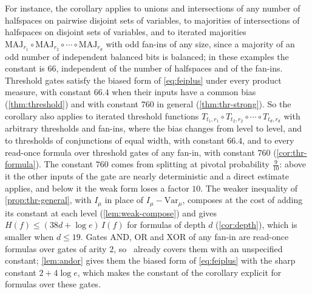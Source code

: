 \documentclass[11pt]{amsart}
\theoremstyle{definition}
\theoremstyle{remark}
\newcommand{\Var}{\mathrm{Var}}
\begin{document}
For instance, the corollary applies to unions and intersections of any number of halfspaces on pairwise disjoint
sets of variables, to majorities of intersections of halfspaces on disjoint sets of variables, and to iterated
majorities $\mathrm{MAJ}_{r_1}\circ\mathrm{MAJ}_{r_2}\circ\cdots\circ\mathrm{MAJ}_{r_d}$ with odd fan-ins of any
size, since a majority of an odd number of independent balanced bits is balanced; in these examples the constant is
$66$, independent of the number of halfspaces and of the fan-ins. Threshold gates satisfy the biased form of
\eqref{eq:feiplus} under every product measure, with constant $66.4$ when their inputs have a common bias
(\cref{thm:threshold}) and with constant $760$ in general (\cref{thm:thr-strong}). So the corollary also applies to
iterated threshold functions $T_{t_1,r_1}\circ T_{t_2,r_2}\circ\cdots\circ T_{t_d,r_d}$ with arbitrary thresholds and
fan-ins, where the bias changes from level to level, and to thresholds of conjunctions of equal width, with constant
$66.4$, and to every read-once formula over threshold gates of any fan-in, with constant $760$
(\cref{cor:thr-formula}). The constant $760$ comes from splitting at pivotal probability $\frac9{10}$: above it the
other inputs of the gate are nearly deterministic and a direct estimate applies, and below it the weak form loses a
factor $10$. The weaker inequality of \cref{prop:thr-general}, with $I_\mu$ in place
of $I_\mu-\Var_\mu$, composes at the cost of adding its constant at each level (\cref{lem:weak-compose}) and gives
$H(f)\le(38d+\log e)\,I(f)$ for formulas of depth $d$ (\cref{cor:depth}), which is smaller when $d\le19$. Gates $\mathrm{AND}$, $\mathrm{OR}$ and $\mathrm{XOR}$
of any fan-in are read-once formulas over gates of arity $2$, so~\cite{OT13} already covers them with an unspecified
constant; \cref{lem:andor} gives them the biased form of \eqref{eq:feiplus} with the sharp constant $2+4\log e$, which
makes the constant of the corollary explicit for formulas over these gates.
\end{document}
